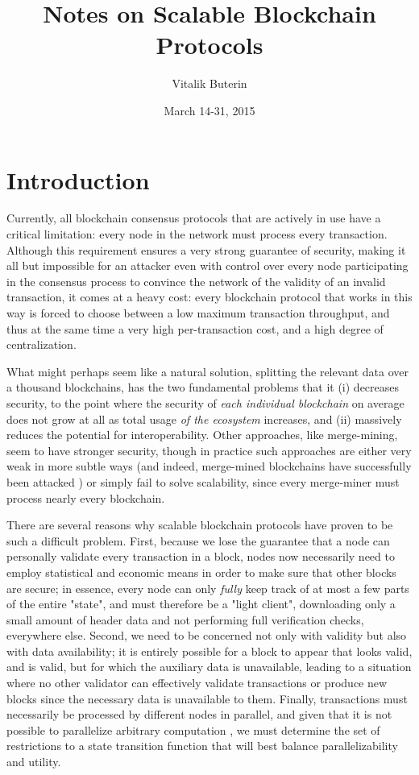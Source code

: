 \documentclass[11pt,a4paper]{report}
\title{Notes on Scalable Blockchain Protocols}
\date{March 14-31, 2015}
\author{Vitalik Buterin}
\theoremstyle{plain}
\theoremstyle{definition}
\theoremstyle{remark}
\begin{document}
\maketitle


\chapter{Introduction}

Currently, all blockchain consensus protocols that are actively in use have a critical limitation: every node in the network must process every transaction. Although this requirement ensures a very strong guarantee of security, making it all but impossible for an attacker even with control over every node participating in the consensus process to convince the network of the validity of an invalid transaction, it comes at a heavy cost: every blockchain protocol that works in this way is forced to choose between a low maximum transaction throughput, and thus at the same time a very high per-transaction cost, and a high degree of centralization.

What might perhaps seem like a natural solution, splitting the relevant data over a thousand blockchains, has the two fundamental problems that it (i) decreases security, to the point where the security of \emph{each individual blockchain} on average does not grow at all as total usage \emph{of the ecosystem} increases, and (ii) massively reduces the potential for interoperability. Other approaches, like merge-mining, seem to have stronger security, though in practice such approaches are either very weak in more subtle ways \cite{mmpetertodd} (and indeed, merge-mined blockchains have successfully been attacked \cite{coiledcoin}) or simply fail to solve scalability, since every merge-miner must process nearly every blockchain.

There are several reasons why scalable blockchain protocols have proven to be such a difficult problem. First, because we lose the guarantee that a node can personally validate every transaction in a block, nodes now necessarily need to employ statistical and economic means in order to make sure that other blocks are secure; in essence, every node can only \emph{fully} keep track of at most a few parts of the entire "state", and must therefore be a "light client", downloading only a small amount of header data and not performing full verification checks, everywhere else. Second, we need to be concerned not only with validity but also with data availability; it is entirely possible for a block to appear that looks valid, and is valid, but for which the auxiliary data is unavailable, leading to a situation where no other validator can effectively validate transactions or produce new blocks since the necessary data is unavailable to them. Finally, transactions must necessarily be processed by different nodes in parallel, and given that it is not possible to parallelize arbitrary computation \cite{parallelcomputing}, we must determine the set of restrictions to a state transition function that will best balance parallelizability and utility.
\end{document}
